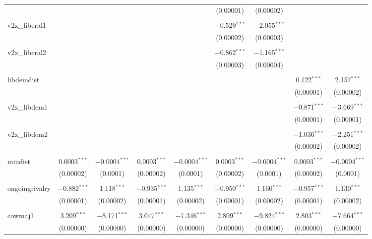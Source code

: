 \begin{table}[!htbp]
\begin{tabular}{@{\extracolsep{5pt}}lcccccccc}
  &  &  &  &  & (0.00001) & (0.00002) &  &  \\ 
  & & & & & & & & \\ 
 v2x\_liberal1 &  &  &  &  & $-$0.529$^{***}$ & $-$2.055$^{***}$ &  &  \\ 
  &  &  &  &  & (0.00002) & (0.00003) &  &  \\ 
  & & & & & & & & \\ 
 v2x\_liberal2 &  &  &  &  & $-$0.862$^{***}$ & $-$1.165$^{***}$ &  &  \\ 
  &  &  &  &  & (0.00003) & (0.00004) &  &  \\ 
  & & & & & & & & \\ 
 libdemdist &  &  &  &  &  &  & 0.122$^{***}$ & 2.157$^{***}$ \\ 
  &  &  &  &  &  &  & (0.00001) & (0.00002) \\ 
  & & & & & & & & \\ 
 v2x\_libdem1 &  &  &  &  &  &  & $-$0.871$^{***}$ & $-$3.669$^{***}$ \\ 
  &  &  &  &  &  &  & (0.00001) & (0.00001) \\ 
  & & & & & & & & \\ 
 v2x\_libdem2 &  &  &  &  &  &  & $-$1.036$^{***}$ & $-$2.251$^{***}$ \\ 
  &  &  &  &  &  &  & (0.00002) & (0.00002) \\ 
  & & & & & & & & \\ 
 mindist & 0.0003$^{***}$ & $-$0.0004$^{***}$ & 0.0003$^{***}$ & $-$0.0004$^{***}$ & 0.0003$^{***}$ & $-$0.0004$^{***}$ & 0.0003$^{***}$ & $-$0.0004$^{***}$ \\ 
  & (0.00002) & (0.0001) & (0.00002) & (0.0001) & (0.00002) & (0.0001) & (0.00002) & (0.0001) \\ 
  & & & & & & & & \\ 
 ongoingrivalry & $-$0.882$^{***}$ & 1.118$^{***}$ & $-$0.935$^{***}$ & 1.135$^{***}$ & $-$0.950$^{***}$ & 1.160$^{***}$ & $-$0.957$^{***}$ & 1.130$^{***}$ \\ 
  & (0.00001) & (0.00002) & (0.00001) & (0.00002) & (0.00001) & (0.00002) & (0.00001) & (0.00002) \\ 
  & & & & & & & & \\ 
 cowmaj1 & 3.209$^{***}$ & $-$8.171$^{***}$ & 3.047$^{***}$ & $-$7.346$^{***}$ & 2.809$^{***}$ & $-$9.824$^{***}$ & 2.803$^{***}$ & $-$7.664$^{***}$ \\ 
  & (0.00000) & (0.00000) & (0.00000) & (0.00000) & (0.00000) & (0.00000) & (0.00000) & (0.00000) \\ 

\end{tabular}
\end{table}
